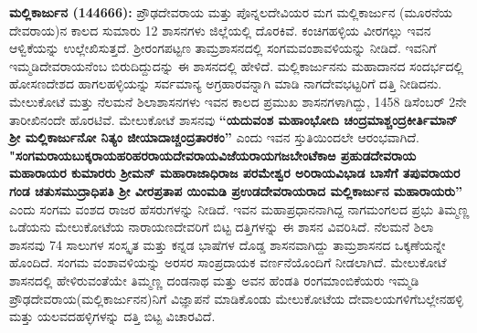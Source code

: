 \textbf{ಮಲ್ಲಿಕಾರ್ಜುನ (144666): }ಪ್ರೌಢದೇವರಾಯ ಮತ್ತು ಪೊನ್ನಲದೇವಿಯರ ಮಗ ಮಲ್ಲಿಕಾರ್ಜುನ (ಮೂರನೆಯ ದೇವರಾಯ)ನ ಕಾಲದ ಸುಮಾರು 12 ಶಾಸನಗಳು ಜಿಲ್ಲೆಯಲ್ಲಿ ದೊರಕಿವೆ. ಕಂಚಿಗಹಳ್ಳಿಯ ವೀರಗಲ್ಲು ಇವನ ಆಳ್ವಿಕೆಯನ್ನು ಉಲ್ಲೇಖಿಸುತ್ತದೆ. ಶ‍್ರೀರಂಗಪಟ್ಟಣ ತಾಮ್ರಶಾಸನದಲ್ಲಿ ಸಂಗಮವಂಶಾವಳಿಯನ್ನು ನೀಡಿದೆ. ಇವನಿಗೆ ಇಮ್ಮಡಿದೇವರಾಯ\-ನೆಂಬ ಬಿರುದಿದ್ದುದನ್ನು ಈ ಶಾಸನದಲ್ಲಿ ಹೇಳಿದೆ. ಮಲ್ಲಿಕಾರ್ಜುನನು ಮಹಾದಾನದ ಸಂದರ್ಭದಲ್ಲಿ ಹೋಸಣದೇಶದ ಹಾಗಲಹಳ್ಳಿಯನ್ನು ಸರ್ವಮಾನ್ಯ ಅಗ್ರಹಾರವನ್ನಾಗಿ ಮಾಡಿ ನಾಗದೇವಭಟ್ಟರಿಗೆ ದತ್ತಿ ನೀಡಿದನು. ಮೇಲುಕೋಟೆ ಮತ್ತು ನೆಲಮನೆ ಶಿಲಾಶಾಸನಗಳು ಇವನ ಕಾಲದ ಪ್ರಮುಖ ಶಾಸನಗಳಾಗಿದ್ದು, 1458 ಡಿಸೆಂಬರ್​ 2ನೇ ತಾರೀಖಿನಂದೇ ಹೊರಟಿವೆ. ಮೇಲುಕೋಟೆ ಶಾಸನವು \textbf{“ಯದುವಂಶ ಮಹಾಂಭೋದಿ ಚಂದ್ರಮಾಶ್ಚಂದ್ರಕೀರ್ತಿಮಾನ್​ ಶ‍್ರೀ ಮಲ್ಲಿಕಾರ್ಜುನೋ ನಿತ್ಯಂ ಜೀಯಾದಾಚ್ಚಂದ್ರತಾರಕಂ”} ಎಂದು ಇವನ ಸ್ತುತಿಯಿಂದಲೇ ಆರಂಭವಾಗಿದೆ. \textbf{"ಸಂಗಮರಾಯಬುಕ್ಕರಾಯಹರಿಹರರಾಯದೇವರಾಯವಿಜೆಯರಾಯಗಜಬೇಂಟೆಕಾಱ ಪ್ರಹುಡದೇವರಾಯ ಮಹಾರಾಯರ ಕುಮಾರರು ಶ‍್ರೀಮನ್​ ಮಹಾರಾಜಾಧಿರಾಜ ಪರಮೇಶ್ವರ\general{\break } ಅರಿರಾಯವಿಭಾಡ ಬಾಸೆಗೆ ತಪುವರಾಯರ ಗಂಡ ಚತುಸಮುದ್ರಾಧಿಪತಿ ಶ‍್ರೀ ವೀರಪ್ರತಾಪ ಯಿಂಮಡಿ ಪ್ರಉಡದೇವರಾಯ\-ರಾದ ಮಲ್ಲಿಕಾರ್ಜುನ ಮಹಾರಾಯರು”} ಎಂದು ಸಂಗಮ ವಂಶದ ರಾಜರ ಹೆಸರುಗಳನ್ನು ನೀಡಿದೆ. ಇವನ ಮಹಾಪ್ರಧಾನ\-ನಾಗಿದ್ದ ನಾಗಮಂಗಲದ ಪ್ರಭು ತಿಮ್ಮಣ್ಣ ಒಡೆಯನು ಮೇಲುಕೋಟೆಯ ನಾರಾಯಣದೇವರಿಗೆ ಬಿಟ್ಟ ದತ್ತಿಗಳನ್ನು ಈ ಶಾಸನ ವಿವರಿಸಿದೆ. ನೆಲಮನೆ ಶಿಲಾ ಶಾಸನವು 74 ಸಾಲುಗಳ ಸಂಸ್ಕೃತ ಮತ್ತು ಕನ್ನಡ ಭಾಷೆಗಳ ದೊಡ್ಡ ಶಾಸನವಾಗಿದ್ದು ತಾಮ್ರಶಾಸನದ ಒಕ್ಕಣೆಯನ್ನೇ ಹೊಂದಿದೆ. ಸಂಗಮ ವಂಶಾವಳಿಯನ್ನು ಅರಸರ ಸಾಂಪ್ರದಾಯಕ ವರ್ಣನೆಯೊಂದಿಗೆ ನೀಡಲಾಗಿದೆ. ಮೇಲುಕೋಟೆ ಶಾಸನದಲ್ಲಿ ಹೇಳಿರುವಂತೆಯೇ ತಿಮ್ಮಣ್ಣ ದಂಡನಾಥ ಮತ್ತು ಅವನ ಹೆಂಡತಿ ರಂಗಮಾಂಬಿಕೆಯರು ಇಮ್ಮಡಿ ಪ್ರೌಢದೇವರಾಯ(ಮಲ್ಲಿಕಾರ್ಜುನನ)ನಿಗೆ ವಿಜ್ಞಾಪನೆ ಮಾಡಿಕೊಂಡು ಮೇಲುಕೋಟೆಯ ದೇವಾಲಯಗಳಿಗೆ\break ಬಲ್ಲೇನಹಳ್ಳಿ ಮತ್ತು ಯಲವದಹಳ್ಳಿಗಳನ್ನು ದತ್ತಿ ಬಿಟ್ಟ ವಿಚಾರವಿದೆ.

